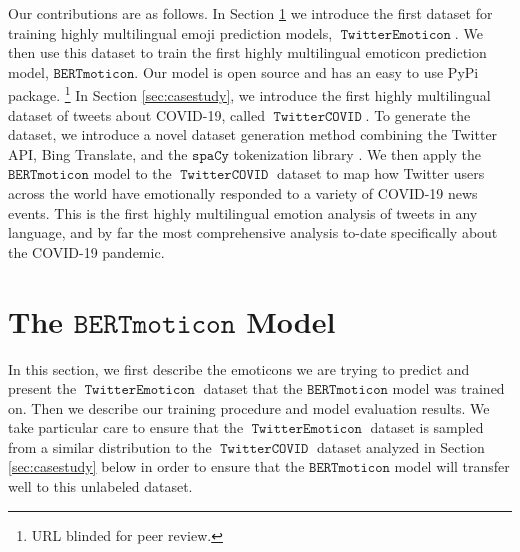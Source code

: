 \documentclass[11pt]{article}
\newcommand{\XXX}{{\color{red}\textbf{XXX}}~}
\newcommand{\bertmoji}{\texttt{BERTmoticon}}
\newcommand{\spacy}{\texttt{spaCy}}
\DeclareMathOperator{\emoticon}{\texttt{TwitterEmoticon}}
\DeclareMathOperator{\corona}{\texttt{TwitterCOVID}}
\begin{document}

Our contributions are as follows.
In Section \ref{sec:bertmoji} we introduce the first dataset for training highly multilingual emoji prediction models, $\emoticon$.
We then use this dataset to train the first highly multilingual emoticon prediction model, $\bertmoji$.
Our model is open source and has an easy to use PyPi package.%
\footnote{
    URL blinded for peer review.
}
In Section \ref{sec:casestudy}, we introduce the first highly multilingual dataset of tweets about COVID-19, called $\corona$.
To generate the dataset, we introduce a novel dataset generation method combining the Twitter API, Bing Translate, and the $\spacy$ tokenization library \citep{spacy2}.
We then apply the $\bertmoji$ model to the $\corona$ dataset to map how Twitter users across the world have emotionally responded to a variety of COVID-19 news events.
This is the first highly multilingual emotion analysis of tweets in any language,
and by far the most comprehensive analysis to-date specifically about the COVID-19 pandemic.


\section{The $\bertmoji$ Model}
\label{sec:bertmoji}

In this section, we first describe the emoticons we are trying to predict and present the $\emoticon$ dataset that the $\bertmoji$ model was trained on.
Then we describe our training procedure and model evaluation results.
We take particular care to ensure that the $\emoticon$ dataset is sampled from a similar distribution to the $\corona$ dataset analyzed in Section \ref{sec:casestudy} below in order to ensure that the $\bertmoji$ model will transfer well to this unlabeled dataset.

\end{document}
